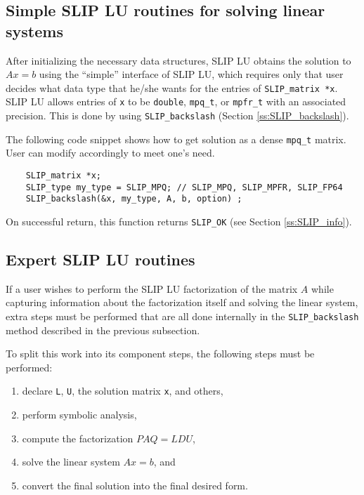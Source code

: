 \documentclass[12pt]{article}
\theoremstyle{definition}
\begin{document}
\cprotect\subsection{Simple SLIP LU routines for solving linear systems}
\label{s:Using:simple}

After initializing the necessary data structures, SLIP LU obtains the solution
to $A x = b$ using the ``simple'' interface of SLIP LU, which requires only that
user decides what data type that he/she wants for the entries of
\verb|SLIP_matrix *x|. SLIP LU allows entries of \verb|x| to be \verb|double|,
\verb|mpq_t|, or \verb|mpfr_t| with an associated precision.
This is done by using \verb|SLIP_backslash| (Section \ref{ss:SLIP_backslash}).

The following code snippet shows how to get solution as a dense \verb|mpq_t|
matrix. User can modify accordingly to meet one's need.

{\small
\begin{verbatim}
    SLIP_matrix *x;
    SLIP_type my_type = SLIP_MPQ; // SLIP_MPQ, SLIP_MPFR, SLIP_FP64
    SLIP_backslash(&x, my_type, A, b, option) ; \end{verbatim} }

On successful return, this function returns \verb|SLIP_OK| (see Section
\ref{ss:SLIP_info}).

\cprotect\subsection{Expert SLIP LU routines}
\label{s:Using:expert}

If a user wishes to perform the SLIP LU factorization of the matrix $A$ while
capturing information about the factorization itself and solving the linear
system, extra steps must be performed that are all done internally in the
\verb|SLIP_backslash| method described in the previous subsection.

To split this work into its component steps, the following steps must be
performed:

\begin{enumerate}
\item declare \verb|L|, \verb|U|, the solution matrix \verb|x|, and others,
\item perform symbolic analysis,
\item compute the factorization $PAQ = L D U$, 
\item solve the linear system $Ax =b$, and
\item convert the final solution into the final desired form.
\end{enumerate}
\end{document}
